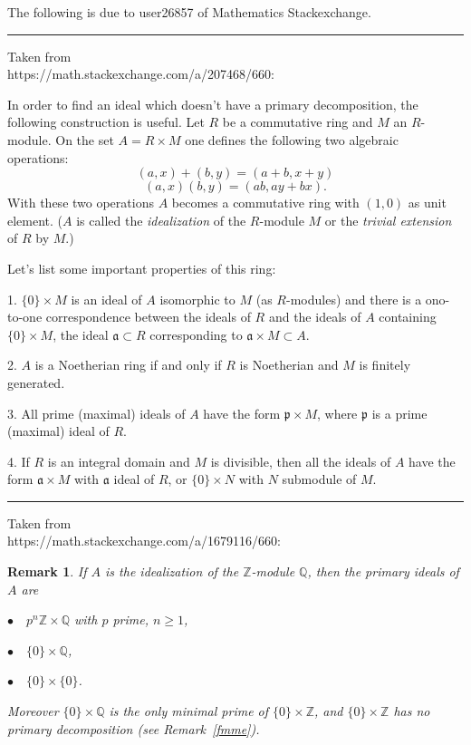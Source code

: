 \documentclass[12pt]{article}
\newcommand{\mf}{\mathfrak}
\newtheorem{rk}[thm]{Remark}
\begin{document}
The following is due to user26857 of Mathematics Stackexchange.\bigskip\bigskip

\hrule\bigskip

Taken from\\ https://math.stackexchange.com/a/207468/660:

In order to find an ideal which doesn't have a primary decomposition, the following construction is useful. Let $R$ be a commutative ring and $M$ an $R$-module. On the set $A=R\times M$ one defines the following two algebraic operations:
$$
(a,x)+(b,y)=(a+b,x+y)
$$
$$
(a,x)(b,y)=(ab,ay+bx).
$$
With these two operations $A$ becomes a commutative ring with $(1,0)$ as unit element. ($A$
is called the \emph{idealization} of the $R$-module $M$ or the \emph{trivial extension} of $R$ by $M$.)

Let's list some important properties of this ring:

1. $\{0\}\times M$ is an ideal of $A$ isomorphic to $M$ (as $R$-modules) and there is a ono-to-one correspondence between the ideals of $R$ and the ideals of $A$ containing $\{0\}\times M$, the ideal $\mf a\subset R$ corresponding to $\mf a\times M\subset A$.

2. $A$ is a Noetherian ring if and only if $R$ is Noetherian and $M$ is finitely generated.

3. All prime (maximal) ideals of $A$ have the form $\mf p\times M$, where $\mf p$ is a prime (maximal) ideal of $R$.

4. If $R$ is an integral domain and $M$ is divisible, then all the ideals of $A$ have the form $\mf a\times M$ with $\mf a$ ideal of $R$, or $\{0\}\times N$ with $N$ submodule of $M$.\bigskip\bigskip

\hrule\bigskip%

Taken from\\ https://math.stackexchange.com/a/1679116/660:\bigskip

\begin{rk}%
If $A$ is the idealization of the $\mathbb Z$-module $\mathbb Q$, then the primary ideals of $A$ are  

$\bullet\quad p^n\mathbb Z\times\mathbb Q$ with $p$ prime, $n\ge1$, 

$\bullet\quad\{0\}\times\mathbb Q$,

$\bullet\quad\{0\}\times\{0\}$. 

Moreover $\{0\}\times\mathbb Q$ is the only minimal prime of $\{0\}\times\mathbb Z$, and $\{0\}\times\mathbb Z$ has no primary decomposition (see Remark~\ref{fmme}).
\end{rk}\bigskip
\end{document}
